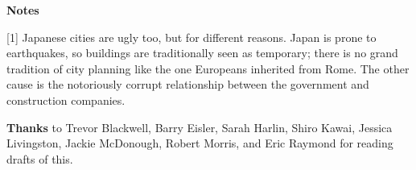 \textbf{Notes}

{[}1{]} Japanese cities are ugly too, but for different reasons. Japan
is prone to earthquakes, so buildings are traditionally seen as
temporary; there is no grand tradition of city planning like the one
Europeans inherited from Rome. The other cause is the notoriously
corrupt relationship between the government and construction companies.

\textbf{Thanks} to Trevor Blackwell, Barry Eisler, Sarah Harlin, Shiro
Kawai, Jessica Livingston, Jackie McDonough, Robert Morris, and Eric
Raymond for reading drafts of this.

